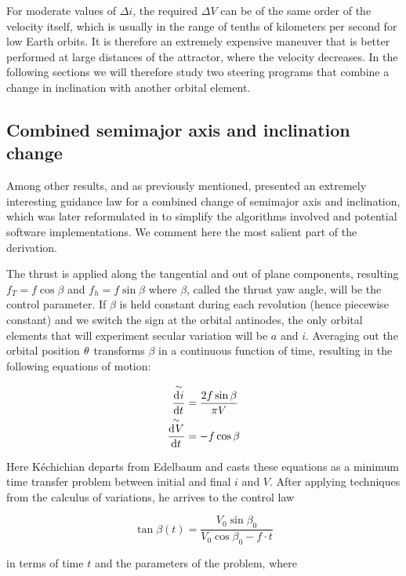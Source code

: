For moderate values of $\Delta i$, the required $\Delta V$ can be of the same order of the velocity itself, which is usually in the range of tenths of kilometers per second for low Earth orbits. It is therefore an extremely expensive maneuver that is better performed at large distances of the attractor, where the velocity decreases. In the following sections we will therefore study two steering programs that combine a change in inclination with another orbital element.

\subsection{Combined semimajor axis and inclination change} \label{sec:metedelbaum}

Among other results, and as previously mentioned, \cite{edelbaum1961propulsion} presented an extremely interesting guidance law for a combined change of semimajor axis and inclination, which was later reformulated in \cite{kechichian1997reformulation} to simplify the algorithms involved and potential software implementations. We comment here the most salient part of the derivation.

The thrust is applied along the tangential and out of plane components, resulting $f_T = f \cos{\beta}$ and $f_h = f \sin{\beta}$ where $\beta$, called the thrust yaw angle, will be the control parameter. If $\beta$ is held constant during each revolution (hence piecewise constant) and we switch the sign at the orbital antinodes, the only orbital elements that will experiment secular variation will be $a$ and $i$. Averaging out the orbital position $\theta$ transforms $\beta$ in a continuous function of time, resulting in the following equations of motion:

\begin{align*}
\overset{\sim}{\frac{\operatorname{d}\!^{} i}{\operatorname{d}\! t^{}}} & = \frac{2 f \sin{\beta}}{\pi V} \\
\overset{\sim}{\frac{\operatorname{d}\!^{} V}{\operatorname{d}\! t^{}}} & = -f \cos{\beta}
\end{align*}

Here Kéchichian departs from Edelbaum and casts these equations as a minimum time transfer problem between initial and final $i$ and $V$. After applying techniques from the calculus of variations, he arrives to the control law

\[
\tan{\beta(t)} = \frac{V_0 \sin{\beta_0}}{V_0 \cos{\beta_0} - f \cdot t}
\]

in terms of time $t$ and the parameters of the problem, where

